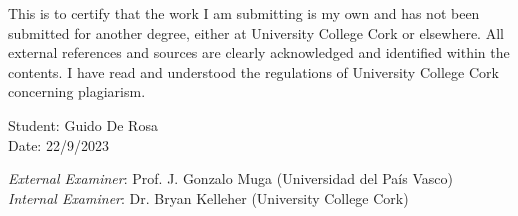 This is to certify that the work I am submitting is my own and has not been
submitted for another degree, either at University College Cork or elsewhere. All
external references and sources are clearly acknowledged and identified within the
contents. I have read and understood the regulations of University College Cork
concerning plagiarism.

\hfill

\noindent Student: Guido De Rosa \\
\noindent Date: 22/9/2023

\hfill

\noindent \emph{External Examiner}: Prof. J. Gonzalo Muga (Universidad del Pa\'{i}s Vasco)\\
\noindent \emph{Internal Examiner}: Dr. Bryan Kelleher (University College Cork)
